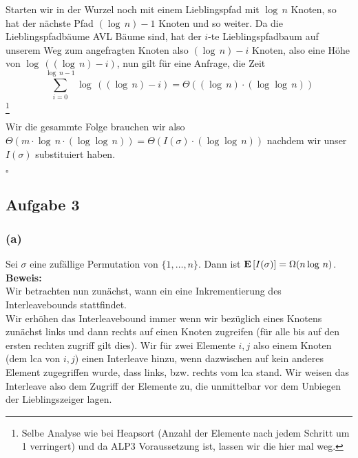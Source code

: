 \documentclass[11pt,a4paper,ngerman]{article}
\newcommand{\erw}[1]{\text{\bfseries E} \left[ #1 \right]}
\begin{document}
Starten wir in der Wurzel noch mit einem Lieblingspfad mit $\log \, n$ Knoten, so hat der nächste Pfad $(\log \, n)-1$ Knoten und so weiter. Da die Lieblingspfadbäume AVL Bäume sind, hat der $i$-te Lieblingspfadbaum auf unserem Weg zum angefragten Knoten also $(\log \, n) - i$ Knoten,
also eine Höhe von $\log \, ((\log \, n) - i)$, nun gilt für eine Anfrage, die Zeit
$$
	\sum_{i=0}^{\log \, n - 1} \log \, ((\log \, n) - i) = \Theta((\log \,n) \cdot (\log \log \, n))
$$\footnote{Selbe Analyse wie bei Heapsort (Anzahl der Elemente nach jedem Schritt um 1 verringert) und da ALP3 Voraussetzung ist, lassen wir die hier mal weg.}

Wir die gesammte Folge brauchen wir also $\Theta(m \cdot \log \, n \cdot (\log \log \, n))= \Theta(I(\sigma) \cdot (\log \log \, n))$ nachdem wir
unser $I(\sigma)$  substituiert haben.

\mbox{}\hfill$\square$











\subsection*{Aufgabe 3}

\subsubsection*{(a)} Sei $\sigma$ eine zufällige Permutation von $\{ 1 , \ldots , n \}$. Dann ist $\erw{I(\sigma)} = \Omega(n \log \, n)$.\\

\noindent\textbf{Beweis:}\\


Wir betrachten nun zunächst, wann ein eine Inkrementierung des Interleavebounds stattfindet. \\

Wir erhöhen das Interleavebound immer wenn wir bezüglich eines Knotens zunächst links und dann rechts auf einen Knoten zugreifen (für alle bis auf den ersten rechten zugriff gilt dies). Wir für zwei Elemente $i,j$ also einem Knoten (dem lca von $i,j$) einen Interleave hinzu, wenn
dazwischen auf kein anderes Element zugegriffen wurde, dass links, bzw. rechts vom lca stand. Wir weisen das Interleave also dem Zugriff der Elemente zu, die unmittelbar vor dem Unbiegen der Lieblingszeiger lagen.
\end{document}
